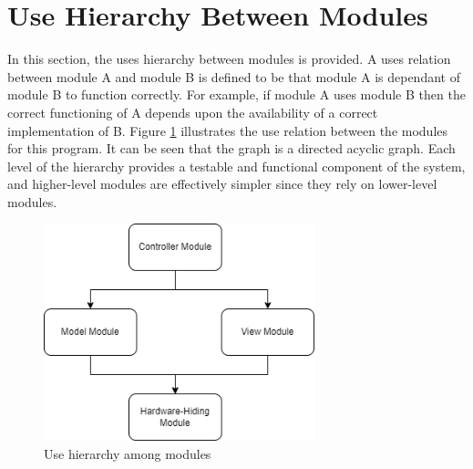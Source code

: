 \documentclass[12pt, titlepage]{article}
\begin{document}
\section{Use Hierarchy Between Modules} \label{SecUse}

In this section, the uses hierarchy between modules is
provided. A uses relation between module A and module B is defined to be that module A is dependant of module B to function correctly. For example, if module A uses module B then the correct functioning of A depends upon the availability of a correct
implementation of B. Figure \ref{FigUH} illustrates the use relation between
the modules for this program. It can be seen that the graph is a directed acyclic graph. Each level of the hierarchy provides a testable and functional component of the system, and higher-level modules are effectively simpler since they rely on lower-level modules.

\begin{figure}[H]
\centering
\includegraphics[width=0.7\textwidth]{Poker_UseDiagram.png}
\caption{Use hierarchy among modules}
\label{FigUH}
\end{figure}
\end{document}
